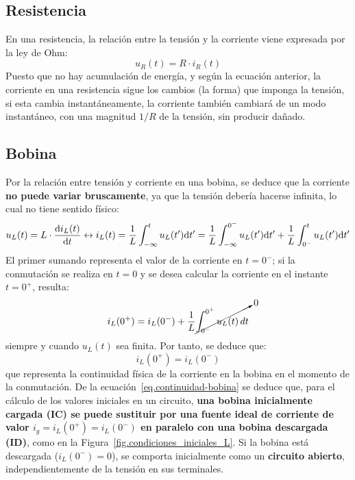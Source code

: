\documentclass[11pt]{book} %
\begin{document}
	\subsection{Resistencia}
	En una resistencia, la relación entre la tensión y la corriente viene expresada por la ley de Ohm:
	\begin{equation*}
		u_R(t)=R\cdot i_R(t)
	\end{equation*}
	Puesto que no hay acumulación de energía, y según la ecuación anterior, la corriente en una resistencia sigue los cambios (la forma) que imponga la tensión, si esta cambia instantáneamente, la corriente también cambiará de un modo instantáneo, con una magnitud $1/R$ de la tensión, sin producir dañado. 
	
	\subsection{Bobina}
	Por la relación entre tensión y corriente en una bobina, se deduce que la corriente \textbf{no puede variar bruscamente}, ya que la tensión debería hacerse infinita, lo cual no tiene sentido físico:
	\begin{equation*}
		u_L(t) = L \cdot \diff{i_L(t)}{t}
\leftrightarrow
i_L(t) = \frac{1}{L} \int^t_{-\infty}u_L(t') \mathrm{d}t'= \frac{1}{L} \int^{0^-}_{-\infty}u_L(t')\mathrm{d}t' + \frac{1}{L} \int^{t}_{0^-}u_L(t')\mathrm{d}t'
	\end{equation*}
	El primer sumando representa el valor de la corriente en $t=0^-$; si la conmutación se realiza en $t=0$ y se desea calcular la corriente en el instante $t=0^+$, resulta:
	\begin{equation*}
		i_L(0^+)=i_L(0^-)+ \dfrac{1}{L}\cancelto{0}{\int_{0^-}^{0^+} u_L(t)\, dt}
	\end{equation*}
	siempre y cuando $u_L(t)$ sea finita. Por tanto, se deduce que:
	\begin{equation}\label{eq.continuidad-bobina}
		\boxed{i_L(0^+)=i_L(0^-)}
	\end{equation}
	que representa la continuidad física de la corriente en la bobina en el momento de la conmutación. De la ecuación~\eqref{eq.continuidad-bobina} se deduce que, para el cálculo de los valores iniciales en un circuito, \textbf{una bobina inicialmente cargada (IC) se puede sustituir por una fuente ideal de corriente de valor $i_g=i_L(0^+)=i_L(0^-)$ en paralelo con una bobina descargada (ID)}, como en la Figura~\ref{fig.condiciones_iniciales_L}. Si la bobina está descargada ($i_L(0^-)=0$), se comporta inicialmente como un \textbf{circuito abierto}, independientemente de la tensión en sus terminales.
\end{document}
